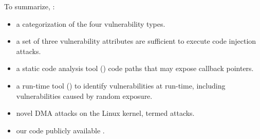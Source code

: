 To summarize, \DIFdelbegin {}\DIFdelend \DIFaddbegin {}\DIFaddend :
\begin{itemize}
    \item \DIFdelbegin {}\DIFdelend \DIFaddbegin {}\DIFaddend a categorization of the four \subpage{} vulnerability types.
    \item \DIFdelbegin {}\DIFdelend \DIFaddbegin {}\DIFaddend a set of three vulnerability attributes \DIFdelbegin {}\DIFdelend \DIFaddbegin {}\DIFaddend are sufficient to execute code injection attacks.
    \item \DIFdelbegin {}\DIFdelend \DIFaddbegin {}\DIFaddend a static code analysis tool (\tool) \DIFdelbegin {}\DIFdelend \DIFaddbegin {}\DIFaddend code paths that may expose callback pointers. 
    \item \DIFdelbegin {}\DIFdelend \DIFaddbegin {}\DIFaddend a run-time tool (\dkasan) to identify \subpage{} vulnerabilities at run-time, including vulnerabilities caused by random exposure.
    \item \DIFdelbegin {}\DIFdelend \DIFaddbegin {}\DIFaddend novel DMA attacks on the Linux kernel, termed \compound{} attacks.
    \item \DIFdelbegin {}\DIFdelend \DIFaddbegin {}\DIFaddend our code publicly available \cite{DKASAN,SPADE}.
\end{itemize}



